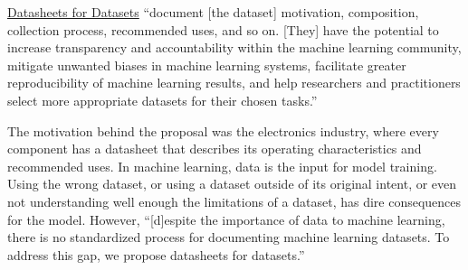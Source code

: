 \documentclass{article}
\begin{document}
\href{https://arxiv.org/abs/1803.09010}{Datasheets for Datasets} ``document [the dataset] motivation, composition, collection process, recommended uses, and so on. [They] have the potential to increase transparency and accountability within the machine learning community, mitigate unwanted biases in machine learning systems, facilitate greater reproducibility of machine learning results, and help researchers and practitioners select more appropriate datasets for their chosen tasks.''

The motivation behind the proposal was the electronics industry, where every component has a datasheet that describes its operating characteristics and recommended uses. In machine learning, data is the input for model training. Using the wrong dataset, or using a dataset outside of its original intent, or even not understanding well enough the limitations of a dataset, has dire consequences for the model. However, ``[d]espite the importance of data to machine learning, there is no standardized process for documenting machine learning datasets. To address this gap, we propose datasheets for datasets.''
\end{document}
